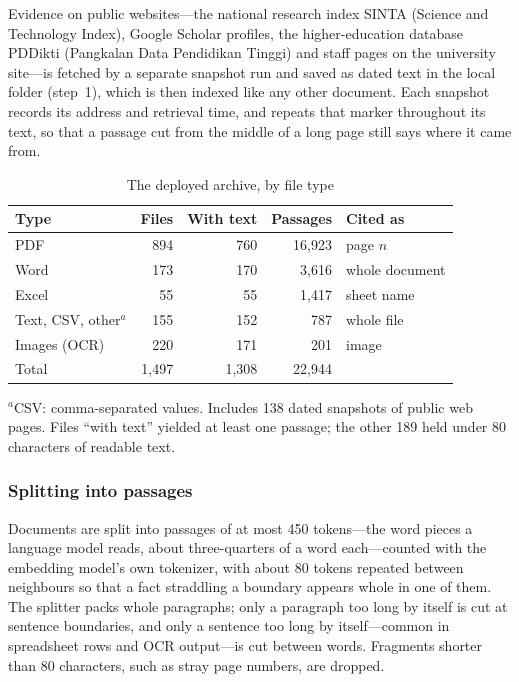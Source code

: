 \documentclass[conference]{IEEEtran}
\begin{document}
Evidence on public websites---the national research index SINTA (Science and
Technology Index), Google Scholar profiles, the higher-education database
PDDikti (Pangkalan Data Pendidikan Tinggi) and staff pages on the
university site---is fetched by a separate snapshot run and saved as dated text
in the local folder (step~1), which is then indexed like any other document. Each snapshot records its
address and retrieval time, and repeats that marker throughout its text, so
that a passage cut from the middle of a long page still says where it came
from.

\begin{table}[t]
\caption{The deployed archive, by file type}
\label{tab:corpus}
\centering
\footnotesize
\begin{tabular}{@{}lrrrl@{}}
\toprule
Type & Files & With text & Passages & Cited as \\
\midrule
PDF                      & 894 & 760 & 16{,}923 & page $n$ \\
Word                     & 173 & 170 &  3{,}616 & whole document \\
Excel                    &  55 &  55 &  1{,}417 & sheet name \\
Text, CSV, other$^{a}$   & 155 & 152 &     787 & whole file \\
Images (OCR)             & 220 & 171 &     201 & image \\
\midrule
Total                    & 1{,}497 & 1{,}308 & 22{,}944 & \\
\bottomrule
\end{tabular}

\smallskip
\parbox{\columnwidth}{\scriptsize $^{a}$CSV: comma-separated values. Includes
138 dated snapshots of public web pages. Files ``with text'' yielded at least
one passage; the other 189 held under 80 characters of readable text.}
\end{table}

\subsubsection{Splitting into passages}
Documents are split into passages of at most 450 tokens---the word pieces a
language model reads, about three-quarters of a word each---counted with the
embedding model's own tokenizer, with about 80 tokens repeated between
neighbours so that a fact straddling a boundary appears whole in one of them.
The splitter packs whole paragraphs; only a paragraph too long by itself is cut
at sentence boundaries, and only a sentence too long by itself---common in
spreadsheet rows and OCR output---is cut between words. Fragments shorter than
80 characters, such as stray page numbers, are dropped.
\end{document}
